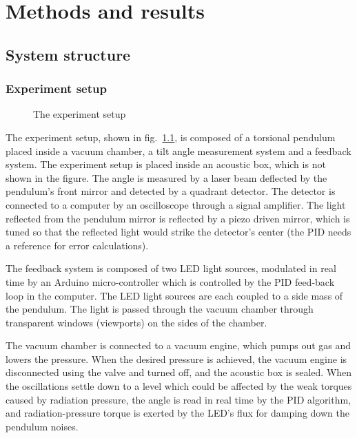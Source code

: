 \documentclass[\main/master.tex]{subfiles}
\begin{document}
\newspacing
\chapter{Methods and results}\label{chapter:Methods and results}

\section{System structure}
\subsection{Experiment setup}
\begin{figure}[htbp]
	\centering
	\caption[The experiment setup]{The experiment setup}
	\label{fig:setup}
\end{figure}
\FloatBarrier
\par\noindent
The experiment setup, shown in fig.~\ref{fig:setup}, is composed of a torsional pendulum placed inside a vacuum chamber, a tilt angle measurement system and a feedback system. The experiment setup is placed inside an acoustic box, which is not shown in the figure. The angle is measured by a laser beam deflected by the pendulum's front mirror and detected by a quadrant detector. The detector is connected to a computer by an oscilloscope through a signal amplifier. The light reflected from the pendulum mirror is reflected by a piezo driven mirror, which is tuned so that the reflected light would strike the detector's center (the PID needs a reference for error calculations). 
\par\noindent
The feedback system is composed of two LED light sources, modulated in real time by an Arduino micro-controller which is controlled by the PID feed-back loop in the computer. The LED light sources are each coupled to a side mass of the pendulum. The light is passed through the vacuum chamber through transparent windows (viewports) on the sides of the chamber. 
\par\noindent
The vacuum chamber is connected to a vacuum engine, which pumps out gas and lowers the pressure. When the desired pressure is achieved, the vacuum engine is disconnected using the valve and turned off, and the acoustic box is sealed. When the oscillations settle down to a level which could be affected by the weak torques caused by radiation pressure, the angle is read in real time by the PID algorithm, and radiation-pressure torque is exerted by the LED's flux for damping down the pendulum noises.
\end{document}
